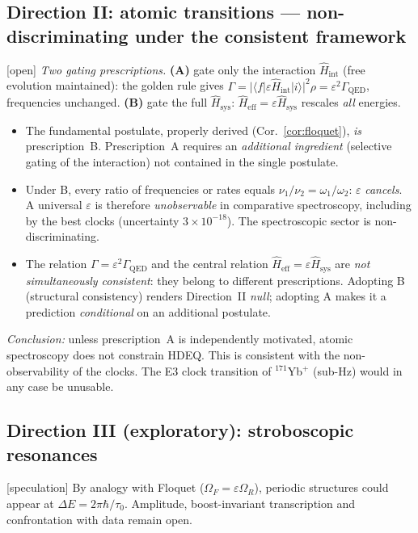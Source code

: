 \documentclass[11pt,a4paper]{article}
\newcommand{\Hsysop}{\hat{H}_{\mathrm{sys}}}
\newcommand{\Heff}{\hat{H}_{\mathrm{eff}}}
\newcommand{\statut}[1]{{\footnotesize\textsf{[#1]}}}
\theoremstyle{plain}
\theoremstyle{definition}
\theoremstyle{remark}
\begin{document}
\subsection{Direction II: atomic transitions --- non-discriminating under the consistent framework}
\statut{open} \emph{Two gating prescriptions.} \textbf{(A)} gate only the
interaction $\hat H_{\mathrm{int}}$ (free evolution maintained): the golden rule
gives $\Gamma=|\langle f|\varepsilon\hat H_{\mathrm{int}}|i\rangle|^2\rho
=\varepsilon^2\Gamma_{\mathrm{QED}}$, frequencies unchanged. \textbf{(B)} gate the
full $\Hsysop$: $\Heff=\varepsilon\Hsysop$ rescales \emph{all} energies.
\begin{itemize}
\item The fundamental postulate, properly derived (Cor.~\ref{cor:floquet}),
\emph{is} prescription~B. Prescription~A requires an \emph{additional ingredient}
(selective gating of the interaction) not contained in the single postulate.
\item Under B, every ratio of frequencies or rates equals $\nu_1/\nu_2=\omega_1/\omega_2$:
$\varepsilon$ \emph{cancels}. A universal $\varepsilon$ is therefore
\emph{unobservable} in comparative spectroscopy, including by the best clocks
(uncertainty $3\times10^{-18}$). The spectroscopic sector is non-discriminating.
\item The relation $\Gamma=\varepsilon^2\Gamma_{\mathrm{QED}}$ and the central
relation $\Heff=\varepsilon\Hsysop$ are \emph{not simultaneously consistent}: they
belong to different prescriptions. Adopting B (structural consistency) renders
Direction~II \emph{null}; adopting A makes it a prediction \emph{conditional} on
an additional postulate.
\end{itemize}
\emph{Conclusion:} unless prescription~A is independently motivated, atomic
spectroscopy does not constrain HDEQ. This is consistent with the
non-observability of the clocks. The E3 clock transition of $^{171}$Yb$^+$
(sub-Hz) would in any case be unusable.

\subsection{Direction III (exploratory): stroboscopic resonances}
\statut{speculation} By analogy with Floquet ($\Omega_F=\varepsilon\Omega_R$),
periodic structures could appear at $\Delta E=2\pi\hbar/\tau_0$. Amplitude,
boost-invariant transcription and confrontation with data remain open.

\end{document}
